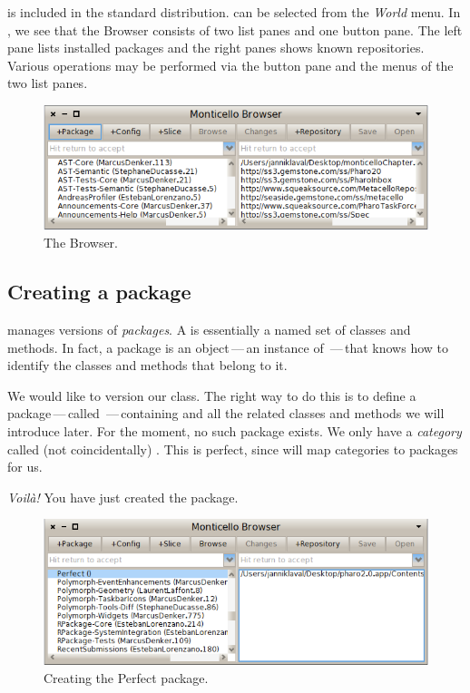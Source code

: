 \documentclass[a4paper,10pt,twoside]{book}
\begin{document}
\Mont is included in the standard \pharo distribution.
 can be selected from the \emph{World} menu.
In , we see that the \Mont Browser consists of two list panes and one button pane. The left pane lists installed packages and the right panes shows known repositories.
Various operations may be performed via the button pane and the menus of the two list panes.

\begin{figure}[ht]\centering
	\includegraphics[width=\textwidth]{monticelloBrowser}
	\caption{The \Mont Browser.}
\end{figure}

\subsection{Creating a package}

\Mont manages versions of \emph{packages}.  A  is essentially a named set of classes and methods.
In fact, a package is an object\,---\,an instance of \,---\,that knows how to identify the classes and methods that belong to it.

We would like to version our  class. The right way to do this is to define a package\,---\,called \,---\,containing  and all the related classes and methods we will introduce later. For the moment, no such package exists. We only have a \emph{category} called (not coincidentally) . This is perfect, %
since \Mont will map categories to packages for us.


\emph{Voil\`a!} You have just created the  \Mont package. 

\begin{figure}[ht]\centering
	\includegraphics[width=\textwidth]{perfectPackage}
	\caption{Creating the Perfect package.}
\end{figure}
\end{document}
